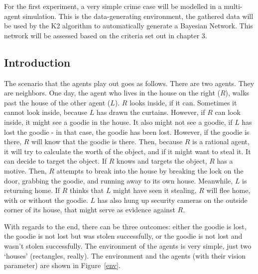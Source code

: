 For the first experiment, a very simple crime case will be modelled in a multi-agent simulation. This is the data-generating environment, the gathered data will be used by the K2 algorithm to automatically generate a Bayesian Network. This network will be assessed based on the criteria set out in chapter 3.  

\subsection{Introduction}

The scenario that the agents play out goes as follows. There are two agents. They are neighbors. One day, the agent who lives in the house on the right ($R$), walks past the house of the other agent ($L$). $R$ looks inside, if it can. Sometimes it cannot look inside, because $L$ has drawn the curtains. However, if $R$ can look inside, it might see a goodie in the house. It also might not see a goodie, if $L$ has lost the goodie - in that case, the goodie has been lost. However, if the goodie is there, $R$ will know that the goodie is there. Then, because $R$ is a rational agent, it will try to calculate the worth of the object, and if it might want to steal it. It can decide to target the object. If $R$ knows and targets the object, $R$ has a motive. Then, $R$ attempts to break into the house by breaking the lock on the door, grabbing the goodie, and running away to its own house.  Meanwhile, $L$ is returning home. If $R$ thinks that $L$ might have seen it stealing, $R$ will flee home, with or without the goodie. $L$ has also hung up security cameras on the outside corner of its house, that might serve as evidence against $R$.

With regards to the end, there can be three outcomes: either the goodie is lost, the goodie is not lost but was stolen successfully, or the goodie is not lost and wasn't stolen successfully. %
The environment of the agents is very simple, just two `houses' (rectangles, really). The environment and the agents (with their vision parameter) are shown in Figure~\ref{env}.

